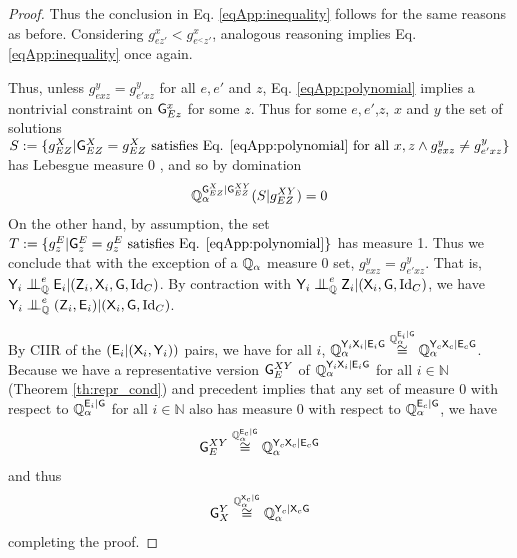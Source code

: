 \begin{proof}
Thus the conclusion in Eq. \eqref{eqApp:inequality} follows for the same reasons as before. Considering $g^x_{ez'}< g^x_{e^<z'}$, analogous reasoning implies Eq. \eqref{eqApp:inequality} once again.

Thus, unless $g^y_{exz}=g^y_{e'xz}$ for all $e,e'$ and $z$, Eq. \eqref{eqApp:polynomial} implies a nontrivial constraint on $\mathsf{G}^x_{Ez}$ for some $z$. Thus for some $e,e'$,$z$, $x$ and $y$ the set of solutions $S:=\{g^X_{EZ}|\mathsf{G}^X_{EZ}=g^X_{EZ}\text{ satisfies Eq. \eqref{eqApp:polynomial} for all }x, z\land g^y_{exz}\neq g^y_{e'xz}\}$ has Lebesgue measure 0 \citep{okamoto_distinctness_1973}, and so by domination
\begin{align}
    \mathbb{Q}_{\alpha}^{\mathsf{G}^X_{EZ}|\mathsf{G}^{XY}_{EZ}}(S|g^{XY}_{EZ}) = 0
\end{align}
On the other hand, by assumption, the set $T:=\{g^E_{z}|\mathsf{G}^E_z=g^E_z\text{ satisfies Eq. \eqref{eqApp:polynomial}}\}$ has measure 1. Thus we conclude that with the exception of a $\mathbb{Q}_\alpha$ measure 0 set, $g^y_{exz}=g^y_{e'xz}$. That is, $\RV{Y}_i\CI^e_{\prob{Q}} \RV{E}_i|(\RV{Z}_i,\RV{X}_i,\RV{G},\text{Id}_C)$. By contraction with $\RV{Y}_i\CI^e_{\prob{Q}} \RV{Z}_i|(\RV{X}_i,\RV{G},\text{Id}_C)$, we have $\RV{Y}_i\CI^e_{\prob{Q}} (\RV{Z}_i,\RV{E}_i)|(\RV{X}_i,\RV{G},\text{Id}_C)$. 

By CIIR of the $(\mathsf{E}_i|(\mathsf{X}_i,\mathsf{Y}_i))$ pairs, we have for all $i$, $\mathbb{Q}_\alpha^{\mathsf{Y}_i\mathsf{X}_i|\mathsf{E}_i\mathsf{G}}\overset{\mathbb{Q}_\alpha^{\mathsf{E}_i|\mathsf{G}}}{\cong}\mathbb{Q}_\alpha^{\mathsf{Y}_c\mathsf{X}_c|\mathsf{E}_c\mathsf{G}}$. Because we have a representative version $\mathsf{G}^{XY}_E$ of $\mathbb{Q}_\alpha^{\mathsf{Y}_i\mathsf{X}_i|\mathsf{E}_i\mathsf{G}}$ for all $i\in \mathbb{N}$ (Theorem \ref{th:repr_cond}) and precedent implies that any set of measure 0 with respect to  $\mathbb{Q}_\alpha^{\mathsf{E}_i|\mathsf{G}}$ for all $i\in\mathbb{N}$ also has measure 0 with respect to $\mathbb{Q}_\alpha^{\mathsf{E}_c|\mathsf{G}}$, we have
\begin{align}
    \mathsf{G}^{XY}_{E} \overset{\mathbb{Q}_\alpha^{\mathsf{E}_c|\mathsf{G}}}{\cong} \mathbb{Q}_\alpha^{\mathsf{Y}_c\mathsf{X}_c|\mathsf{E}_c\mathsf{G}}
\end{align}
and thus
\begin{align}
    \mathsf{G}^Y_X \overset{\mathbb{Q}_\alpha^{\mathsf{X}_c|\mathsf{G}}}{\cong} \mathbb{Q}_\alpha^{\mathsf{Y}_c|\mathsf{X}_c\mathsf{G}}
\end{align}
completing the proof.
\end{proof}



